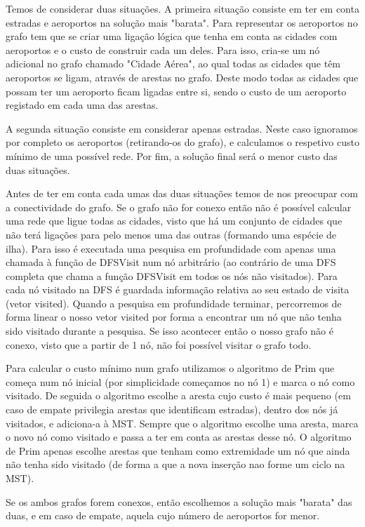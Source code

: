\documentclass{scrartcl}
\begin{document}
Temos de considerar duas situações. A primeira situação consiste em ter em conta estradas e aeroportos na solução mais "barata". Para representar os aeroportos no grafo tem que se criar uma ligação lógica que tenha em conta as cidades com aeroportos e o custo de construir cada um deles. Para isso, cria-se um nó adicional no grafo chamado "Cidade Aérea", ao qual todas as cidades que têm aeroportos se ligam, através de arestas no grafo. Deste modo todas as cidades que possam ter um aeroporto ficam ligadas entre si, sendo o custo de um aeroporto registado em cada uma das arestas.

A segunda situação consiste em considerar apenas estradas. Neste caso ignoramos por completo os aeroportos (retirando-os do grafo), e calculamos o respetivo custo mínimo de uma possível rede. Por fim, a solução final será o menor custo das duas situações.

Antes de ter em conta cada umas das duas situações temos de nos preocupar com a conectividade do grafo. Se o grafo não for conexo então não é possível calcular uma rede que ligue todas as cidades, visto que há um conjunto de cidades que não terá ligações para pelo menos uma das outras (formando uma espécie de ilha). Para isso é executada uma pesquisa em profundidade com apenas uma chamada à função de DFSVisit num nó arbitrário (ao contrário de uma DFS completa que chama a função DFSVisit em todos os nós não visitados). Para cada nó visitado na DFS é guardada informação relativa ao seu estado de visita (vetor visited). Quando a pesquisa em profundidade terminar, percorremos de forma linear o nosso vetor visited por forma a encontrar um nó que não tenha sido visitado durante a pesquisa. Se isso acontecer então o nosso grafo não é conexo, visto que a partir de 1 nó, não foi possível visitar o grafo todo.

Para calcular o custo mínimo num grafo utilizamos o algoritmo de Prim que começa num nó inicial (por simplicidade começamos no nó 1) e marca o nó como visitado. De seguida o algoritmo escolhe a aresta cujo custo é mais pequeno (em caso de empate privilegia arestas que identificam estradas), dentro dos nós já visitados, e adiciona-a à MST. Sempre que o algoritmo escolhe uma aresta, marca o novo nó como visitado e passa a ter em conta as arestas desse nó. O algoritmo de Prim apenas escolhe arestas que tenham como extremidade um nó que ainda não tenha sido visitado (de forma a que a nova inserção nao forme um ciclo na MST).

Se os ambos grafos forem conexos, então escolhemos a solução mais "barata" das duas, e em caso de empate, aquela cujo número de aeroportos for menor.
\end{document}
